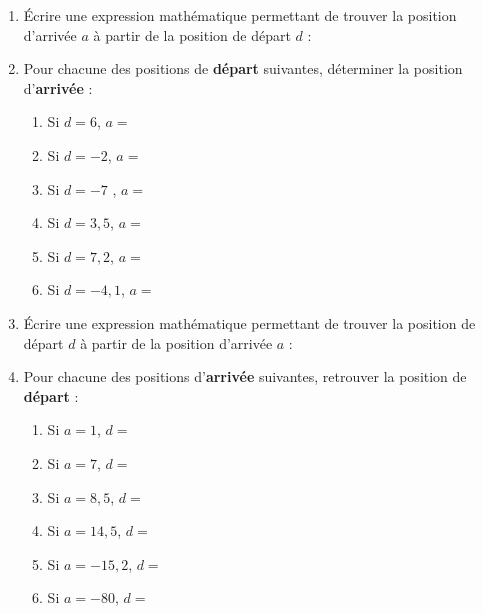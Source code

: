 \documentclass[
	classe=$2^{de}$,
	headerTitle=Activité\space-\space Chapitre\space 1
]{exercice}
\begin{document}
\begin{enumerate}
	\item Écrire une expression mathématique permettant de trouver la position d'arrivée $a$ à partir de la position de départ $d$ :
	      \begin{center}
	      \end{center}
	\item Pour chacune des positions de \textbf{départ} suivantes, déterminer la position d'\textbf{arrivée} :
	      \begin{multicols}{2}
		      \begin{enumerate}
			      \item Si $d = 6$, $a = $
			      \item Si $d = -2$, $a = $
			      \item Si $d = -7$ , $a = $
			      \item Si $d = 3,5$, $a = $
			      \item Si $d = 7,2$, $a = $
			      \item Si $d = -4,1$, $a = $
		      \end{enumerate}
	      \end{multicols}
	\item Écrire une expression mathématique permettant de trouver la position de départ $d$ à partir de la position d'arrivée $a$ :
	      \begin{center}
	      \end{center}
	\item Pour chacune des positions d'\textbf{arrivée} suivantes, retrouver la position de \textbf{départ} :
	      \begin{multicols}{2}
		      \begin{enumerate}
			      \item Si $a = 1$, $d = $
			      \item Si $a = 7$, $d = $
			      \item Si $a = 8,5$, $d = $
			      \item Si $a = 14,5$, $d = $
			      \item Si $a = -15,2$, $d = $
			      \item Si $a = -80$, $d = $
		      \end{enumerate}
	      \end{multicols}
\end{enumerate}
\end{document}

